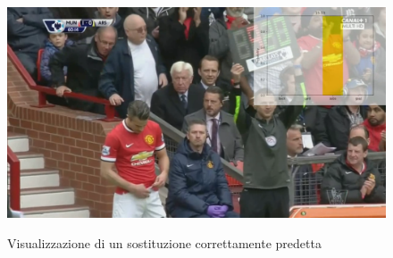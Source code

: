 \begin{figure}[H]
\centering
\caption{Visualizzazione di un sostituzione correttamente predetta}
\includegraphics[width=\linewidth]{img/videosubsHQ.png}
\label{figure : videosub}
\end{figure}
